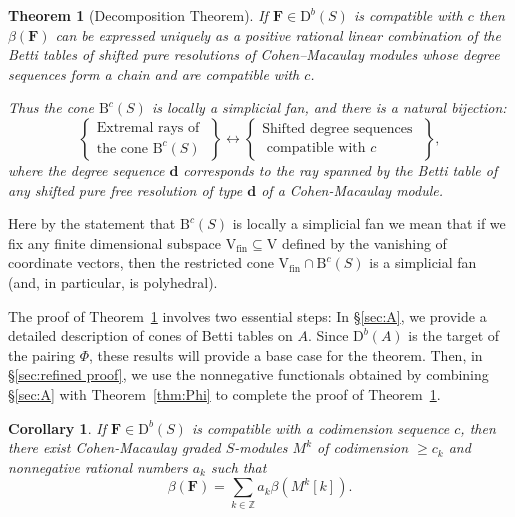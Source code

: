 \documentclass[12pt]{amsart}
\newtheorem{cor}[lemma]{Corollary}
\newtheorem{thm}[lemma]{Theorem}
\theoremstyle{definition}
\theoremstyle{remark}
\newcommand{\ZZ}{\mathbb{Z}}
\newcommand{\VV}{\mathrm{V}}
\newcommand{\cc}{c}
\newcommand{\dd}{\mathbf{d}}
\newcommand{\FF}{\mathbf{F}}
\newcommand{\DD}{\mathrm{D}}
\newcommand{\BBQ}{\mathrm{B}}
\begin{document}
\begin{thm}[Decomposition Theorem]\label{thm:extremal rays refined}
If $\FF\in \DD^b(S)$  is compatible with $\cc$ then  $\beta(\FF)$ can be expressed
uniquely as a positive rational linear combination of the Betti tables of shifted pure resolutions of Cohen--Macaulay modules whose degree sequences form a chain and are compatible with $\cc$.

Thus the cone $\BBQ^{\cc}(S)$ is locally a simplicial fan, and there is a natural bijection:
\[
\left\{
\begin{matrix}
\text{Extremal rays of }\\
\text{the cone } \BBQ^{\cc}(S)
\end{matrix}
\right\}
\longleftrightarrow
\left\{
\begin{matrix}
\text{Shifted degree sequences }\\
\text{ compatible with $\cc$}
\end{matrix}
\right\},
\]
where the  degree sequence $\dd$ corresponds to the ray spanned by 
the Betti table of any shifted pure free resolution of type $\dd$ of a Cohen-Macaulay module. 
\end{thm}

Here by the statement that $\BBQ^{\cc}(S)$ is locally a simplicial fan we mean that if we fix any finite dimensional subspace $\VV_{\text{fin}}\subseteq \VV$ defined by the vanishing of coordinate vectors, then the restricted cone $\VV_{\text{fin}}\cap \BBQ^{\cc}(S)$ is a simplicial fan (and, in particular,
is polyhedral). 

The proof of Theorem~\ref{thm:extremal rays refined} involves two essential steps:  In \S\ref{sec:A}, we provide a detailed description of cones of Betti tables on $A$.  Since $\DD^b(A)$ is the target of the pairing $\Phi$, these results will provide a base case for the theorem.  Then, in \S\ref{sec:refined proof}, 
we use the nonnegative functionals obtained by combining  \S\ref{sec:A} with Theorem~\ref{thm:Phi} to complete the proof of Theorem~\ref{thm:extremal rays refined}. 

\begin{cor}\label{cor:decompose refined}
If $\FF\in \DD^b(S)$ is compatible with a codimension sequence $\cc$,
then there exist Cohen-Macaulay graded $S$-modules $M^k$ of codimension $\geq \cc_k$ and nonnegative rational numbers $a_k$ such that
\[
\beta(\FF)=\sum_{k\in \ZZ} a_k\beta(M^k[k]).
\]
\end{cor}
\end{document}
